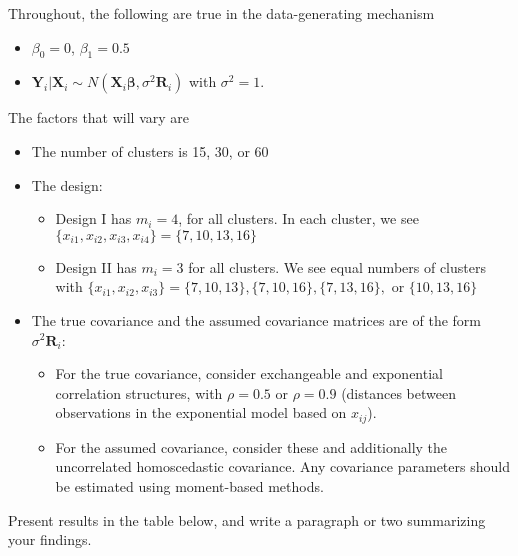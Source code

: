 \documentclass[11pt, letterpaper]{article}
\newcommand{\bX}{{\bm X}}
\newcommand{\bY}{{\bm Y}}
\newcommand{\bR}{{\bm R}}
\newcommand{\bbeta}{{\bm \beta}}
\begin{document}
{Throughout, the following are true in the data-generating mechanism
\begin{itemize}
\item $\beta_0=0$, $\beta_1 = 0.5$
\item $\bY_i|\bX_i\sim N(\bX_i \bbeta, \sigma^2 \bR_i)$ with $\sigma^2=1$. 
\end{itemize}
The factors that will vary are
\begin{itemize}
\item The number of clusters is 15, 30, or 60
\item The design: \begin{itemize}
\item Design I has $m_i = 4$, for all clusters. In each cluster, we see $\{x_{i1}, x_{i2},x_{i3},x_{i4}\}=\{7,10,13,16\}$
\item Design II has $m_i=3$ for all clusters.  We see equal numbers of clusters with $\{x_{i1}, x_{i2},x_{i3}\}=\{7,10,13\}, \{7,10,16\}, \{7, 13, 16\}, \textrm{ or }\{10, 13, 16\}$
\end{itemize}
\item The true covariance and the assumed covariance matrices are of the form $\sigma^2 \bR_i$:
\begin{itemize}
\item For the true covariance, consider exchangeable and exponential correlation structures, with $\rho=0.5$ or $\rho=0.9$ (distances between observations in the exponential model based on $x_{ij}$). 
\item For the assumed covariance, consider these and additionally the uncorrelated homoscedastic covariance.  Any covariance parameters should be estimated  using moment-based methods.
\end{itemize}
\end{itemize}


Present results in the table below, and write a paragraph or two summarizing your findings.

}
\end{document}
